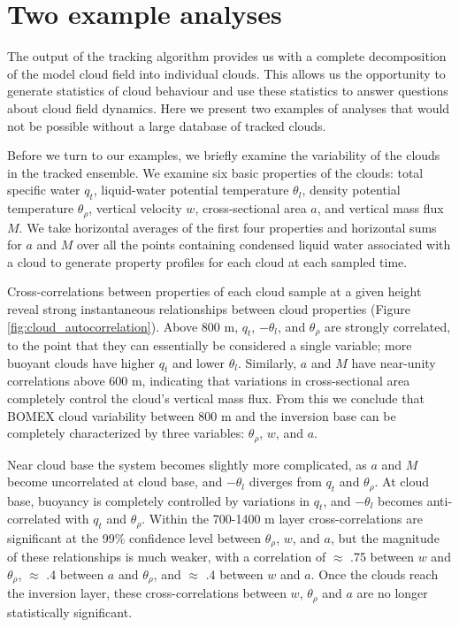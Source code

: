 \documentclass[acp]{copernicus}
\begin{document}
\section{Two example analyses}

The output of the tracking algorithm provides us with a complete decomposition 
of the model cloud field into individual clouds.  This allows us the 
opportunity to generate statistics of cloud behaviour and use these statistics 
to answer questions about cloud field dynamics.  Here we present two examples 
of analyses that would not be possible without a large database of tracked 
clouds.

Before we turn to our examples, we briefly examine the variability of the 
clouds in the tracked ensemble.  We examine six basic properties of the 
clouds: total specific water $q_t$, liquid-water potential temperature 
$\theta_l$, density potential temperature $\theta_\rho$, vertical velocity 
$w$, cross-sectional area $a$, and vertical mass flux $M$.  We take horizontal 
averages of the first four properties and horizontal sums for $a$ and $M$ over 
all the points containing condensed liquid water associated with a cloud to 
generate property profiles for each cloud at each sampled time.

Cross-correlations between properties of each cloud sample at a given height 
reveal strong instantaneous relationships between cloud properties (Figure 
\ref{fig:cloud_autocorrelation}).  Above 800 m, $q_t$, $-\theta_l$, and 
$\theta_\rho$ are strongly correlated, to the point that they can essentially 
be considered a single variable; more buoyant clouds have higher $q_t$ and 
lower $\theta_l$.  Similarly, $a$ and $M$ have near-unity correlations above 
600 m, indicating that variations in cross-sectional area completely control 
the cloud's vertical mass flux.  From this we conclude that BOMEX cloud 
variability between 800 m and the inversion base can be completely 
characterized by three variables: $\theta_\rho$, $w$, and $a$.  

Near cloud base the system becomes slightly more complicated, as $a$ and $M$ 
become uncorrelated at cloud base, and $-\theta_l$ diverges from $q_t$ and 
$\theta_\rho$.  At cloud base, buoyancy is completely controlled by 
variations in $q_t$, and $-\theta_l$ becomes anti-correlated with $q_t$ and 
$\theta_\rho$.  Within the 700-1400 m layer cross-correlations are 
significant at the 99\% confidence level between $\theta_\rho$, $w$, and $a$, 
but the magnitude of these relationships is much weaker, with a correlation of 
$\approx$ .75 between $w$ and $\theta_\rho$, $\approx$ .4 between $a$ 
and $\theta_\rho$, and $\approx$ .4 between $w$ and $a$.  Once the clouds 
reach the inversion layer, these cross-correlations between $w$, 
$\theta_\rho$ and $a$ are no longer statistically significant.
\end{document}
